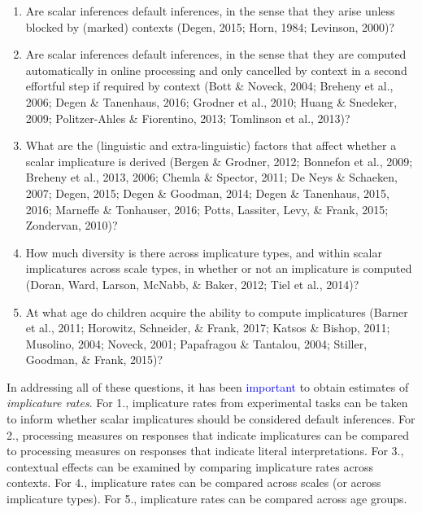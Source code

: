 \documentclass[man]{apa6}
\newcommand{\change}[1]{\textcolor{Blue}{#1}}
\theoremstyle{definition}
\theoremstyle{definition}
\theoremstyle{definition}
\theoremstyle{remark}
\begin{document}
\begin{enumerate}
\def\labelenumi{\arabic{enumi}.}
\item
  Are scalar inferences default inferences, in the sense that they arise
  unless blocked by (marked) contexts (Degen, 2015; Horn, 1984;
  Levinson, 2000)?
\item
  Are scalar inferences default inferences, in the sense that they are
  computed automatically in online processing and only cancelled by
  context in a second effortful step if required by context (Bott \&
  Noveck, 2004; Breheny et al., 2006; Degen \& Tanenhaus, 2016; Grodner
  et al., 2010; Huang \& Snedeker, 2009; Politzer-Ahles \& Fiorentino,
  2013; Tomlinson et al., 2013)?
\item
  What are the (linguistic and extra-linguistic) factors that affect
  whether a scalar implicature is derived (Bergen \& Grodner, 2012;
  Bonnefon et al., 2009; Breheny et al., 2013, 2006; Chemla \& Spector,
  2011; De Neys \& Schaeken, 2007; Degen, 2015; Degen \& Goodman, 2014;
  Degen \& Tanenhaus, 2015, 2016; Marneffe \& Tonhauser, 2016; Potts,
  Lassiter, Levy, \& Frank, 2015; Zondervan, 2010)?
\item
  How much diversity is there across implicature types, and within
  scalar implicatures across scale types, in whether or not an
  implicature is computed (Doran, Ward, Larson, McNabb, \& Baker, 2012;
  Tiel et al., 2014)?
\item
  At what age do children acquire the ability to compute implicatures
  (Barner et al., 2011; Horowitz, Schneider, \& Frank, 2017; Katsos \&
  Bishop, 2011; Musolino, 2004; Noveck, 2001; Papafragou \& Tantalou,
  2004; Stiller, Goodman, \& Frank, 2015)?
\end{enumerate}

In addressing all of these questions, it has been \change{important} to obtain
estimates of \emph{implicature rates}. For 1., implicature rates from
experimental tasks can be taken to inform whether scalar implicatures
should be considered default inferences. For 2., processing measures on
responses that indicate implicatures can be compared to processing
measures on responses that indicate literal interpretations. For 3.,
contextual effects can be examined by comparing implicature rates across
contexts. For 4., implicature rates can be compared across scales (or
across implicature types). For 5., implicature rates can be compared
across age groups.
\end{document}
